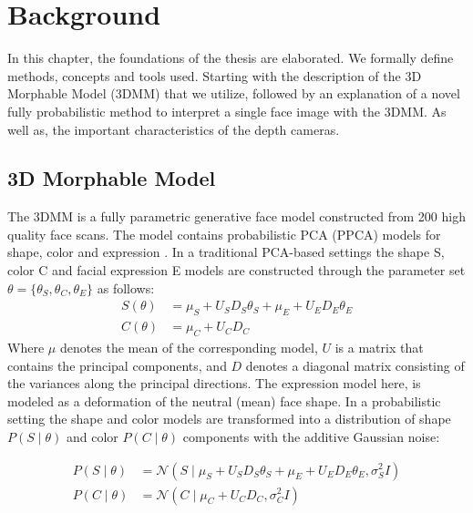 \chapter{Background}\label{ch2}

In this chapter, the foundations of the thesis are elaborated. We formally define methods, concepts and tools used. Starting with the description of the 3D Morphable Model (3DMM) \cite{Blanz:1999:MMS:311535.311556, Romdhani3DM} that we utilize, followed by an explanation of a novel fully probabilistic  method
to interpret a single face image with the 3DMM\cite{Schoenborn2017}. As well as, the important characteristics of the depth cameras. 

\section{3D Morphable Model}
The 3DMM is a fully parametric generative face model constructed from 200 high quality face scans. The model contains probabilistic PCA (PPCA) models for shape, color and expression \cite{8373814, EGGER2017115}.  In a traditional PCA-based settings the shape S, color C and facial expression E models are constructed through the parameter set $\theta=\{\theta_S, \theta_C, \theta_E\}$ as follows:
\begin{equation}
    \begin{split}
    S(\theta) &= \mu_S + U_S D_S \theta_S + \mu_E + U_E D_E \theta_E \\
    C(\theta) &= \mu_C + U_C D_C
    \end{split}
\end{equation}
Where $\mu$ denotes the mean of the corresponding model, $U$ is a matrix that contains the principal components, and $D$ denotes a diagonal matrix consisting of the variances along the principal directions. The expression model here, is modeled as a deformation of the neutral (mean) face shape. In a probabilistic setting the shape and color models are transformed into a distribution of shape $P(S \mid \theta)$ and color $P(C \mid \theta)$ components with the additive Gaussian noise\cite{ALBRECHT2013959, EGGER2017115}:

\begin{equation}
    \begin{split}
    P(S \mid \theta) &= \mathcal{N}(S \mid \mu_S + U_S D_S \theta_S + \mu_E + U_E D_E \theta_E, \sigma_S^2 I) \\
    P(C \mid \theta) &= \mathcal{N}(C \mid \mu_C + U_C D_C, \sigma_C^2 I)
    \end{split}
\end{equation}

